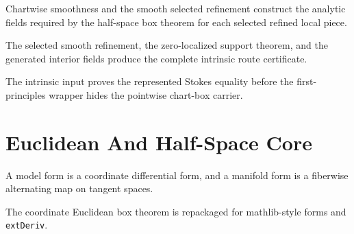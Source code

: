 \begin{definition}
  \label{def:interior_fields_selected_refinement}
  \leanok
  Chartwise smoothness and the smooth selected refinement construct the
  analytic fields required by the half-space box theorem for each selected
  refined local piece.
\end{definition}

\begin{theorem}
  \label{thm:has_intrinsic_route_intrinsic}
  \leanok
  The selected smooth refinement, the zero-localized support theorem, and the
  generated interior fields produce the complete intrinsic route certificate.
\end{theorem}

\begin{theorem}
  \label{thm:intrinsic_represented_stokes}
  \leanok
  The intrinsic input proves the represented Stokes equality before the
  first-principles wrapper hides the pointwise chart-box carrier.
\end{theorem}

\section{Euclidean And Half-Space Core}
\label{sec:euclidean_halfspace_core}

\begin{definition}
  \label{def:model_manifold_forms}
  \leanok
  A model form is a coordinate differential form, and a manifold form is a
  fiberwise alternating map on tangent spaces.
\end{definition}

\begin{theorem}
  \label{thm:box_stokes}
  \leanok
  The coordinate Euclidean box theorem is repackaged for mathlib-style forms
  and \texttt{extDeriv}.
\end{theorem}

